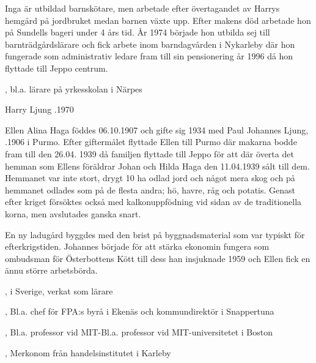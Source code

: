 Inga är utbildad barnskötare, men arbetade efter övertagandet av Harrys hemgård på jordbruket medan barnen växte upp. Efter makens död arbetade hon på Sundells bageri under 4 års tid. År 1974 började hon utbilda sej till barnträdgårdslärare och fick arbete inom barndagvården i Nykarleby där hon fungerade som administrativ ledare fram till sin pensionering år 1996 då hon flyttade till Jeppo centrum.

\begin{jhchildren}
  \item {}
  \item {}, bl.a. lärare på yrkesskolan i Närpes
  \item {}
\end{jhchildren}

Harry Ljung .1970



Ellen Alina Haga föddes 06.10.1907 och gifte sig  1934 med Paul Johannes Ljung, .1906 i Purmo. Efter giftermålet flyttade Ellen till Purmo där makarna bodde fram till den 26.04. 1939 då familjen flyttade till Jeppo för att där överta det hemman som Ellens föräldrar Johan och Hilda Haga den 11.04.1939 sålt till dem. Hemmanet var inte stort, drygt 10 ha odlad jord och något mera skog och på hemmanet odlades som på de flesta andra; hö, havre, råg och potatis. Genast efter kriget försöktes också med kalkonuppfödning vid sidan av de traditionella korna, men avslutades ganska snart.

En ny ladugård byggdes med den brist på byggnadsmaterial som var typiskt för efterkrigstiden. Johannes började för att stärka ekonomin fungera som ombudsman för Österbottens Kött till dess han insjuknade 1959 och Ellen fick en ännu större arbetsbörda.

\begin{jhchildren}
  \item {}
  \item {}, i Sverige, verkat som lärare
  \item {}, Bl.a. chef för FPA:s byrå i Ekenäs och kommundirektör i Snappertuna
  \item {}, Bl.a. professor vid MIT-Bl.a. professor vid MIT-universitetet i Boston
  \item {}, Merkonom från handelsinstitutet i Karleby
\end{jhchildren}

